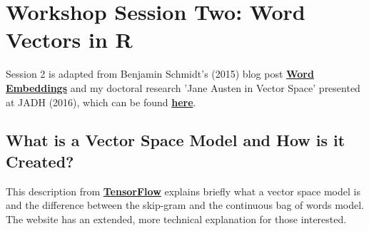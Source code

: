 \documentclass[12pt]{article}
\begin{document}
\section{Workshop Session Two: Word Vectors in R}

Session 2 is adapted from Benjamin Schmidt's (2015) blog post \href{http://bookworm.benschmidt.org/posts/2015-10-25-Word-Embeddings.html}{\textbf{Word Embeddings}} and my doctoral research 'Jane Austen in Vector Space' presented at JADH (2016), which can be found \href{https://sarajkerr.com/talks-and-papers/}{\textbf{here}}.

\subsection{What is a Vector Space Model and How is it Created?}
This description from \href{https://www.tensorflow.org/tutorials/word2vec/}{\textbf{TensorFlow}} explains briefly what a vector space model is and the difference between the skip-gram and the continuous bag of words model. The website has an extended, more technical explanation for those interested.
\end{document}
